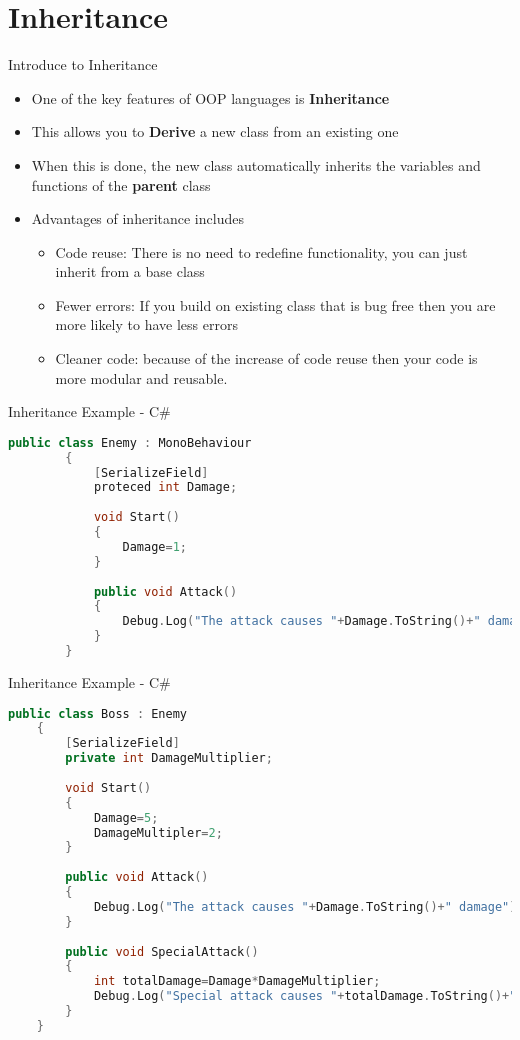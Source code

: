 \part{Inheritance}
\frame{\partpage}

\begin{frame}{Introduce to Inheritance}
	\begin{itemize}
		\pause \item One of the key features of OOP languages is \textbf{Inheritance}
		\pause \item This allows you to \textbf{Derive} a new class from an existing one
		\pause \item When this is done, the new class automatically inherits the variables and functions of the \textbf{parent} class
		\pause \item Advantages of inheritance includes
		\begin{itemize}
			\pause \item Code reuse: There is no need to redefine functionality, you can just inherit from a base class
			\pause \item Fewer errors: If you build on existing class that is bug free then you are more likely to have less errors
			\pause \item Cleaner code: because of the increase of code reuse then your code is more modular and reusable. 
		\end{itemize}
	\end{itemize}
\end{frame}

\begin{frame}[fragile]{Inheritance Example - C\#}
		\begin{lstlisting}[language=C++,basicstyle=\tiny,]
		public class Enemy : MonoBehaviour
		{
			[SerializeField]
			proteced int Damage;
			
			void Start()
			{
				Damage=1;
			}
			
			public void Attack()
			{
				Debug.Log("The attack causes "+Damage.ToString()+" damage");
			}
		}
		\end{lstlisting}
\end{frame}

\begin{frame}[fragile]{Inheritance Example - C\#}
	\begin{lstlisting}[language=C++,basicstyle=\tiny,]
	public class Boss : Enemy
	{
		[SerializeField]
		private int DamageMultiplier; 
		
		void Start()
		{
			Damage=5;
			DamageMultipler=2;
		}
		
		public void Attack()
		{
			Debug.Log("The attack causes "+Damage.ToString()+" damage");
		}
		
		public void SpecialAttack()
		{
			int totalDamage=Damage*DamageMultiplier;
			Debug.Log("Special attack causes "+totalDamage.ToString()+" damage");
		}
	}
	\end{lstlisting}
\end{frame}

